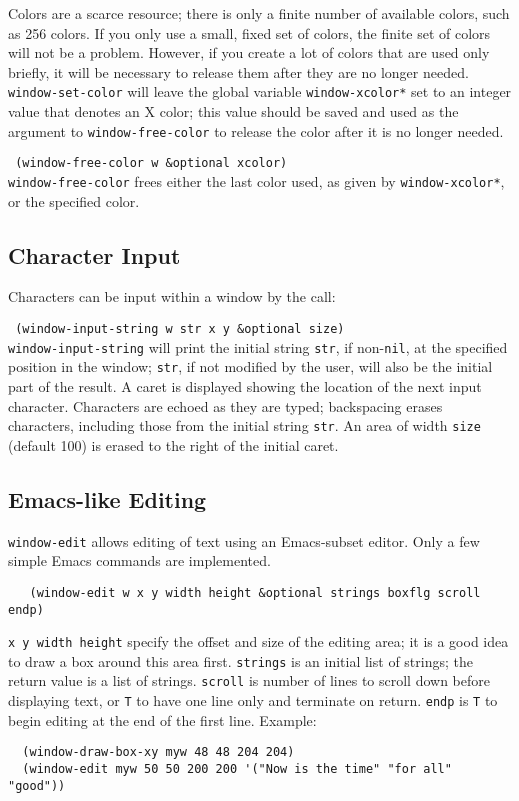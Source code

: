 Colors are a scarce resource; there is only a finite number of
available colors, such as 256 colors.  If you only use a small, fixed set
of colors, the finite set of colors will not be a problem.  However,
if you create a lot of colors that are used only briefly, it will be
necessary to release them after they are no longer needed.
{\tt window-set-color} will leave the global variable {\tt *window-xcolor*}
set to an integer value that denotes an X color; this value should be
saved and used as the argument to {\tt window-free-color} to release
the color after it is no longer needed.

{\tt \hspace*{0.5in} (window-free-color w \&optional xcolor)} \\

{\tt window-free-color} frees either the last color used, as given by
{\tt *window-xcolor*}, or the specified color.


\subsection{Character Input} \label{texted}

Characters can be input within a window by the call:

{\tt \hspace*{0.5in} (window-input-string w str x y \&optional size)} \\

{\tt window-input-string} will print the initial string {\tt str},
if non-{\tt nil},
at the specified position in the window; {\tt str}, if not modified
by the user, will also be the initial part of the result.  A caret
is displayed showing the location of the next input character.
Characters are echoed as they are typed; backspacing erases characters,
including those from the initial string {\tt str}.  An area of width
{\tt size} (default 100) is erased to the right of the initial caret.


\subsection{Emacs-like Editing} \label{emacsed}

{\tt window-edit} allows editing of text using an Emacs-subset editor.
Only a few simple Emacs commands are implemented.
\begin{verbatim}
   (window-edit w x y width height &optional strings boxflg scroll endp)
\end{verbatim}
{\tt x y width height} specify the offset and size of the editing
area; it is a good idea to draw a box around this area first.
{\tt strings} is an initial list of strings; the return value is a list
of strings.
{\tt scroll} is number of lines to scroll down before displaying text,
          or {\tt T} to have one line only and terminate on return.
{\tt endp} is {\tt T} to begin editing at the end of the first line.
Example:
\begin{verbatim}
  (window-draw-box-xy myw 48 48 204 204)
  (window-edit myw 50 50 200 200 '("Now is the time" "for all" "good"))
\end{verbatim}


